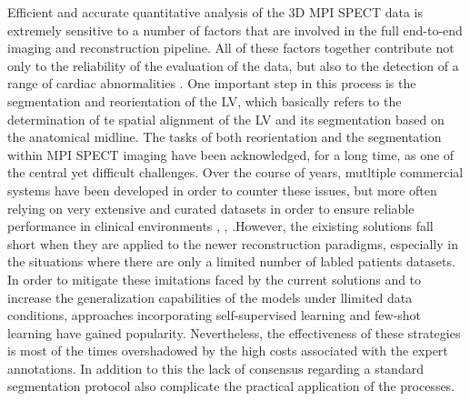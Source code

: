 Efficient and accurate quantitative analysis of the 3D MPI SPECT data is extremely sensitive to a number of factors that are involved in the full end-to-end imaging and reconstruction pipeline. All of these factors together contribute not only to the reliability of the evaluation of the data, but also to the detection of a range of cardiac abnormalities \cite{SLOMKA2012338}. One important step in this process is the segmentation and reorientation of the LV, which basically refers to the determination of te spatial alignment of the LV and its segmentation based on the anatomical midline. The tasks of both reorientation and the segmentation within MPI SPECT imaging have been acknowledged, for a long time, as one of the central yet difficult challenges. Over the course of years, mutltiple commercial systems have been developed in order to counter these issues, but more often relying on very extensive and curated datasets in order to ensure reliable performance in clinical environments \cite{Garcia2007}, \cite{Liu2007}, \cite{Ficaro2007}.However, the eixisting solutions fall short when they are applied to the newer reconstruction paradigms, especially in the situations where there are only a limited number of labled patients datasets. In order to mitigate these imitations faced by the current solutions and to increase the generalization capabilities of the models under llimited data conditions, approaches incorporating self-supervised learning and few-shot learning have gained popularity. Nevertheless, the effectiveness of these strategies is most of the times overshadowed by the high costs associated with the expert annotations. In addition to this the lack of consensus regarding a standard segmentation protocol also complicate the practical application of the processes.

